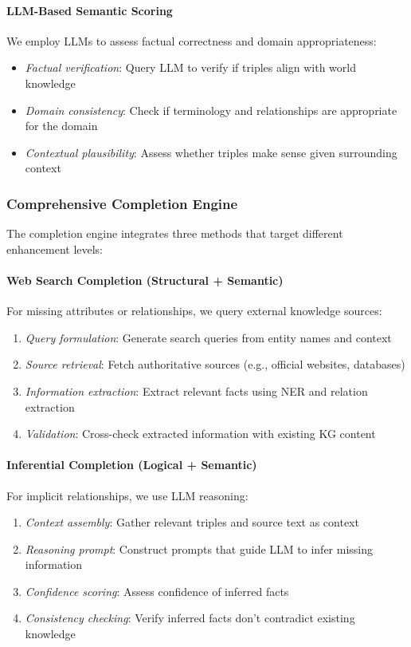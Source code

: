 \documentclass[runningheads]{llncs}
\begin{document}
\paragraph{LLM-Based Semantic Scoring}
We employ LLMs to assess factual correctness and domain appropriateness:
\begin{itemize}
    \item \textit{Factual verification}: Query LLM to verify if triples align with world knowledge
    \item \textit{Domain consistency}: Check if terminology and relationships are appropriate for the domain
    \item \textit{Contextual plausibility}: Assess whether triples make sense given surrounding context
\end{itemize}

\subsubsection{Comprehensive Completion Engine}

The completion engine integrates three methods that target different enhancement levels:

\paragraph{Web Search Completion (Structural + Semantic)}
For missing attributes or relationships, we query external knowledge sources:
\begin{enumerate}
    \item \textit{Query formulation}: Generate search queries from entity names and context
    \item \textit{Source retrieval}: Fetch authoritative sources (e.g., official websites, databases)
    \item \textit{Information extraction}: Extract relevant facts using NER and relation extraction
    \item \textit{Validation}: Cross-check extracted information with existing KG content
\end{enumerate}

\paragraph{Inferential Completion (Logical + Semantic)}
For implicit relationships, we use LLM reasoning:
\begin{enumerate}
    \item \textit{Context assembly}: Gather relevant triples and source text as context
    \item \textit{Reasoning prompt}: Construct prompts that guide LLM to infer missing information
    \item \textit{Confidence scoring}: Assess confidence of inferred facts
    \item \textit{Consistency checking}: Verify inferred facts don't contradict existing knowledge
\end{enumerate}
\end{document}
